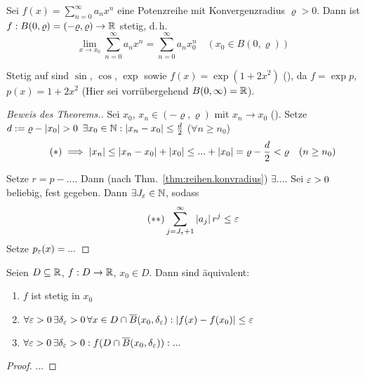 \documentclass[12pt]{scrreprt}
\begin{document}
\begin{thm}\label{thm:fnkt.stetigk-potreihe}
Sei $f(x) = \sum_{n=0}^\infty a_nx^n$ eine Potenzreihe mit Konvergenzradius $\varrho > 0$. Dann ist $f: B(0, \varrho) = (-\varrho, \varrho)\rightarrow\mathbb{R}$
stetig, d.\,h. \[\lim_{x\to x_0} \sum_{n=0}^\infty a_nx^n = \sum_{n=0}^\infty a_nx_0^n\quad (x_0\in B(0, \varrho))\]
\end{thm}
\begin{bsp*}
Stetig auf  sind $\sin$, $\cos$, $\exp$ sowie $f(x) = \exp(1+2x^2)$ (),
da $f=\exp p$, $p(x) = 1+2x^2$ (Hier sei vorrübergehend $B(0, \infty) = \mathbb{R}$).
\end{bsp*}
\begin{proof}[Beweis des Theorems.]
Sei $x_0$, $x_n \in (-\varrho, \varrho)$ mit $x_n\to x_0$ (\ninf). Setze $d:= \varrho-\left\lvert x_0\right\lvert > 0$
\folgt $\exists x_0\in\mathbb{N}: \left\lvert x_n-x_0\right\lvert \le \frac{d}{2}$ ($\forall n\ge n_0$)
\begin{equation}\label{...}\tag{$*$}%
\folgt \abs{x_n} \le \abs{x_n - x_0} + \abs{x_0} \le ... + \abs{x_0} = \varrho - \frac{d}{2} < \varrho\quad (n\ge n_0)
\end{equation}

Setze $r=p - ...$. Dann (nach Thm.~\ref{thm:reihen.konvradius}) $\exists...$. Sei $\varepsilon >0$ beliebig, fest gegeben.
Dann $\exists J_\varepsilon\in\mathbb{N}$, sodass 
\begin{equation}\label{...}\tag{$**$}%
\sum_{j=J_\ep + 1}^\infty \abs{a_j}r^j \le \ep
\end{equation}
\noindent Setze $p_\varepsilon(x) = ...$%
\end{proof}

\begin{satz}\label{satz:fnkt.stetigk-aequiv}
Seien $D\subseteq\mathbb{R}$, $f:D\rightarrow\mathbb{R}$, $x_0\in D$. Dann sind äquivalent:
\begin{enumerate}
\item $f$ ist stetig in $x_0$\label{satz:fnkt.stetigk-aequiv.a}
\item $\forall\varepsilon>0\,\exists\delta_\varepsilon > 0\,\forall x\in D\cap\overline{B}(x_0, \delta_\varepsilon): \left\lvert f(x) - f(x_0)\right\lvert \le \varepsilon$\label{satz:fnkt.stetigk-aequiv.b}
\item $\forall\varepsilon>0\,\exists\delta_\varepsilon > 0: f(D\cap\overline{B}(x_0, \delta_\varepsilon)): ...$\label{satz:fnkt.stetigk-aequiv.c}
\end{enumerate}
\end{satz}
\begin{proof}
...%
\end{proof}
\end{document}
